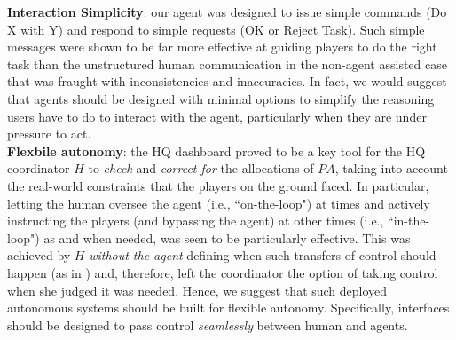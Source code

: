 \noindent \textbf{Interaction Simplicity}: our agent was designed to issue simple commands (Do X with Y) and respond to simple requests (OK or Reject Task). Such simple messages were shown to be far more effective at guiding players to do the right task than the unstructured human communication in the non-agent assisted case that was fraught with inconsistencies and inaccuracies. In fact, we would suggest that agents should be designed with minimal options to simplify the reasoning users have to do to interact with the agent, particularly when they are under pressure to act.\\

\noindent \textbf{Flexbile autonomy}: the HQ dashboard proved to be a key tool for the HQ coordinator $H$ to \emph{check} and \emph{correct for} the allocations of $PA$, taking into account the real-world constraints that the players on the ground faced. In particular, letting the human oversee the agent (i.e., ``on-the-loop") at times and actively instructing  the players (and bypassing the agent) at other times (i.e., ``in-the-loop") as and when needed, was seen to be particularly effective. This was achieved by $H$ \emph{without the agent} defining when such transfers of control should happen (as in \cite{scerri:etal:2005}) and, therefore, left the coordinator the option of taking control when she judged it was needed. Hence, we suggest that such deployed autonomous systems should be built for flexible autonomy. Specifically, interfaces should be designed to pass control \emph{seamlessly} between human and agents.


